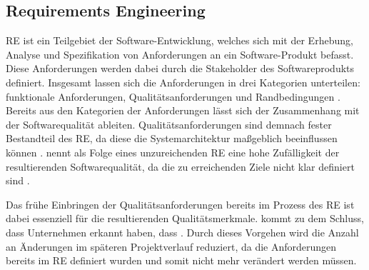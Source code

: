 \subsection{Requirements Engineering}
\ac{RE} ist ein Teilgebiet der Software-Entwicklung, welches sich mit der Erhebung, Analyse und Spezifikation von Anforderungen an ein Software-Produkt befasst.
Diese Anforderungen werden dabei durch die Stakeholder des Softwareprodukts definiert.
Insgesamt lassen sich die Anforderungen in drei Kategorien unterteilen: funktionale Anforderungen, Qualitätsanforderungen und Randbedingungen \autocite[vgl.][S. 3]{pohl_basiswissen_2021}.
\newparagraph
Bereits aus den Kategorien der Anforderungen lässt sich der Zusammenhang mit der Softwarequalität ableiten.
Qualitätsanforderungen sind demnach fester Bestandteil des \ac{RE}, da diese die Systemarchitektur maßgeblich beeinflussen können \autocite[vgl.][S. 3-4]{pohl_basiswissen_2021}.
\citeauthor{ebert_systematisches_2019} nennt als Folge eines unzureichenden \ac{RE} eine hohe Zufälligkeit der resultierenden Softwarequalität, da die zu erreichenden Ziele nicht klar definiert sind \autocite[vgl.][S. 51]{ebert_systematisches_2019}. 

Das frühe Einbringen der Qualitätsanforderungen bereits im Prozess des \ac{RE} ist dabei essenziell für die resultierenden Qualitätsmerkmale.
\citeauthor{ebert_systematisches_2019} kommt zu dem Schluss, dass Unternehmen erkannt haben, dass  \autocite[S. 66]{ebert_systematisches_2019}.
Durch dieses Vorgehen wird die Anzahl an Änderungen im späteren Projektverlauf reduziert, da die Anforderungen bereits im \ac{RE} definiert wurden und somit nicht mehr verändert werden müssen.

